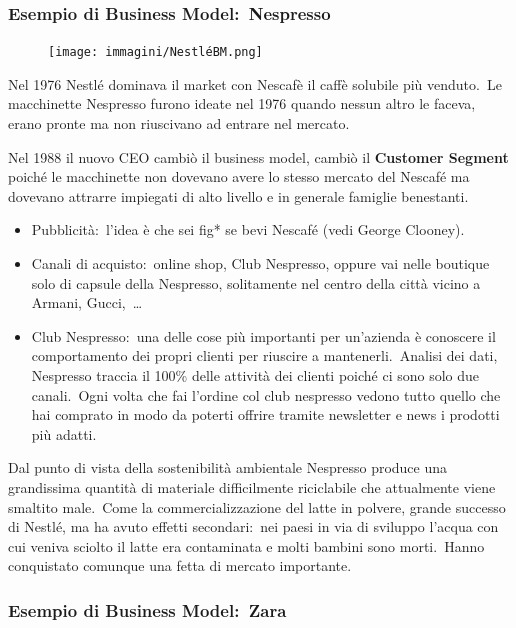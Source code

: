 \subsubsection{Esempio di Business Model:\ Nespresso}

\begin{figure}[H]
    \centering
    \texttt{[image: immagini/NestléBM.png]}
\end{figure}

\noindent Nel 1976 Nestl\'e dominava il market con Nescafè il caffè solubile più venduto.\
Le macchinette Nespresso furono ideate nel 1976 quando nessun altro le faceva, erano pronte ma non riuscivano ad entrare nel mercato.\

Nel 1988 il nuovo CEO cambiò il business model, cambiò il \textbf{Customer Segment} poiché le macchinette non dovevano avere lo stesso mercato del Nescaf\'e ma dovevano attrarre impiegati di alto livello e in generale famiglie benestanti.\

\begin{itemize}
    \item Pubblicità:\ l'idea è che sei fig* se bevi Nescaf\'e (vedi George Clooney).
    \item Canali di acquisto:\ online shop, Club Nespresso, oppure vai nelle boutique solo di capsule della Nespresso, solitamente nel centro della città vicino a Armani, Gucci,\ \dots
    \item Club Nespresso:\ una delle cose più importanti per un'azienda è conoscere il comportamento dei propri clienti per riuscire a mantenerli.\ Analisi dei dati, Nespresso traccia il 100\% delle attività dei clienti poich\'e ci sono solo due canali.\ Ogni volta che fai l'ordine col club nespresso vedono tutto quello che hai comprato in modo da poterti offrire tramite newsletter e news i prodotti più adatti.
\end{itemize}

\noindent Dal punto di vista della sostenibilità ambientale Nespresso produce una grandissima quantità di materiale difficilmente riciclabile che attualmente viene smaltito male.\
Come la commercializzazione del latte in polvere, grande successo di Nestl\'e, ma ha avuto effetti secondari:\ nei paesi in via di sviluppo l'acqua con cui veniva sciolto il latte era contaminata e molti bambini sono morti.\
Hanno conquistato comunque una fetta di mercato importante.

\subsubsection{Esempio di Business Model:\ Zara}

